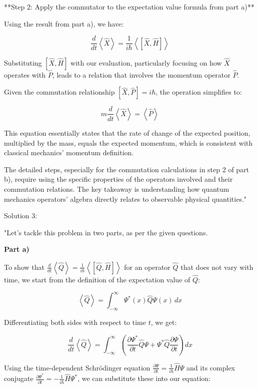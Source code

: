 **Step 2: Apply the commutator to the expectation value formula from part a)**

Using the result from part a), we have:

\[
\frac{d}{dt}\left<\hat{X}\right> = \frac{1}{i\hbar}\left< \left[ \hat{X}, \hat{H} \right] \right>
\]

Substituting \( \left[ \hat{X}, \hat{H}\right] \) with our evaluation, particularly focusing on how \( \hat{X} \) operates with \( \hat{P} \), leads to a relation that involves the momentum operator \( \hat{P} \).

Given the commutation relationship \( \left[ \hat{X}, \hat{P} \right] = i\hbar \), the operation simplifies to:

\[
m\frac{d}{dt}\left<\hat{X}\right> = \left<\hat{P}\right>
\]

This equation essentially states that the rate of change of the expected position, multiplied by the mass, equals the expected momentum, which is consistent with classical mechanics' momentum definition.

The detailed steps, especially for the commutation calculations in step 2 of part b), require using the specific properties of the operators involved and their commutation relations. The key takeaway is understanding how quantum mechanics operators' algebra directly relates to observable physical quantities."

Solution 3:

"Let's tackle this problem in two parts, as per the given questions.

\textbf{Part a)}

To show that \(\frac{d}{dt}\left<\hat{Q}\right> = \frac{1}{i\hbar}\left< \left[ \hat{Q}, \hat{H} \right] \right>\) for an operator \(\hat{Q}\) that does not vary with time, we start from the definition of the expectation value of \(\hat{Q}\):

\[
\left<\hat{Q}\right> = \int_{-\infty}^{\infty} \Psi^{*}(x) \hat{Q} \Psi(x) \, dx
\]

Differentiating both sides with respect to time \(t\), we get:

\[
\frac{d}{dt}\left<\hat{Q}\right> = \int_{-\infty}^{\infty} \left( \frac{\partial \Psi^{*}}{\partial t} \hat{Q} \Psi + \Psi^{*} \hat{Q} \frac{\partial \Psi}{\partial t} \right) dx
\]

Using the time-dependent Schrödinger equation \(\frac{\partial\Psi}{\partial t} = \frac{1}{i\hbar}\hat{H}\Psi\) and its complex conjugate \(\frac{\partial\Psi^{*}}{\partial t} = -\frac{1}{i\hbar}\hat{H}\Psi^{*}\), we can substitute these into our equation:

